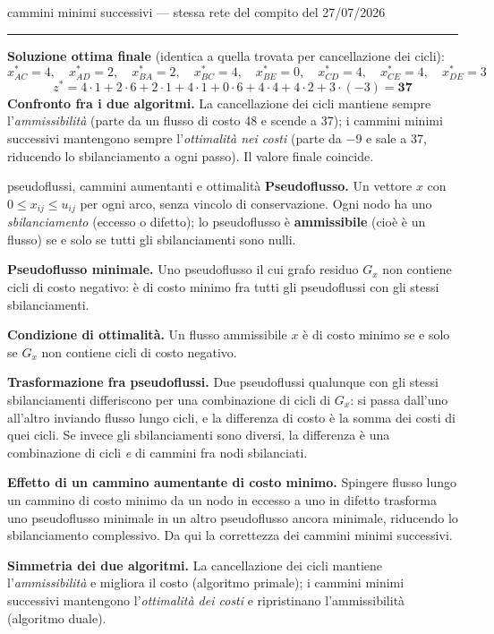 \documentclass[11pt,a4paper]{article}
\begin{document}
\begin{es}{cammini minimi successivi --- stessa rete del compito del 27/07/2026}
\medskip
\hrule
\medskip

\textbf{Soluzione ottima finale} (identica a quella trovata per cancellazione dei cicli):
\[
x_{AC}^*=4,\quad x_{AD}^*=2,\quad x_{BA}^*=2,\quad x_{BC}^*=4,\quad x_{BE}^*=0,
\quad x_{CD}^*=4,\quad x_{CE}^*=4,\quad x_{DE}^*=3
\]
\[
z^* = 4\cdot 1 + 2\cdot 6 + 2\cdot 1 + 4\cdot 1 + 0\cdot 6 + 4\cdot 4 + 4\cdot 2 + 3\cdot(-3) = \mathbf{37}
\]
\textbf{Confronto fra i due algoritmi.} La cancellazione dei cicli mantiene sempre
l'\emph{ammissibilità} (parte da un flusso di costo 48 e scende a 37); i cammini minimi
successivi mantengono sempre l'\emph{ottimalità nei costi} (parte da $-9$ e sale a 37,
riducendo lo sbilanciamento a ogni passo). Il valore finale coincide.
\end{es}

\begin{teo}{pseudoflussi, cammini aumentanti e ottimalità}
\textbf{Pseudoflusso.} Un vettore $x$ con $0\le x_{ij}\le u_{ij}$ per ogni arco,
senza vincolo di conservazione. Ogni nodo ha uno \emph{sbilanciamento} (eccesso o difetto);
lo pseudoflusso è \textbf{ammissibile} (cioè è un flusso) se e solo se tutti gli
sbilanciamenti sono nulli.

\textbf{Pseudoflusso minimale.} Uno pseudoflusso il cui grafo residuo $G_x$ non contiene
cicli di costo negativo: è di costo minimo fra tutti gli pseudoflussi con gli stessi
sbilanciamenti.

\textbf{Condizione di ottimalità.} Un flusso ammissibile $x$ è di costo minimo se e solo se
$G_x$ non contiene cicli di costo negativo.

\textbf{Trasformazione fra pseudoflussi.} Due pseudoflussi qualunque con gli stessi
sbilanciamenti differiscono per una combinazione di cicli di $G_x$: si passa dall'uno all'altro
inviando flusso lungo cicli, e la differenza di costo è la somma dei costi di quei cicli.
Se invece gli sbilanciamenti sono diversi, la differenza è una combinazione di cicli
\emph{e} di cammini fra nodi sbilanciati.

\textbf{Effetto di un cammino aumentante di costo minimo.} Spingere flusso lungo un cammino
di costo minimo da un nodo in eccesso a uno in difetto trasforma uno pseudoflusso minimale
in un altro pseudoflusso ancora minimale, riducendo lo sbilanciamento complessivo.
Da qui la correttezza dei cammini minimi successivi.

\textbf{Simmetria dei due algoritmi.} La cancellazione dei cicli mantiene
l'\emph{ammissibilità} e migliora il costo (algoritmo primale); i cammini minimi successivi
mantengono l'\emph{ottimalità dei costi} e ripristinano l'ammissibilità (algoritmo duale).
\end{teo}
\end{document}
